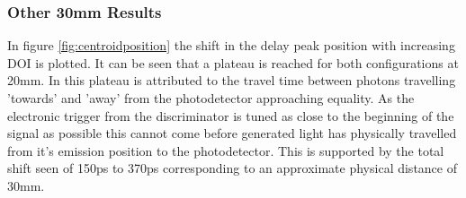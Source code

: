 \subsubsection{Other 30mm Results}
In figure \ref{fig:centroidposition} the shift in the delay peak position with increasing DOI is plotted. It can be seen that a plateau is reached for both configurations at 20mm. In \cite{Moses_Derenzo_1999} this plateau is attributed to the travel time between photons travelling 'towards' and 'away' from the photodetector approaching equality. As the electronic trigger from the discriminator is tuned as close to the beginning of the signal as possible this cannot come before generated light has physically travelled from it's emission position to the photodetector. This is supported by the total shift seen of 150ps to 370ps corresponding to an approximate physical distance of 30mm.